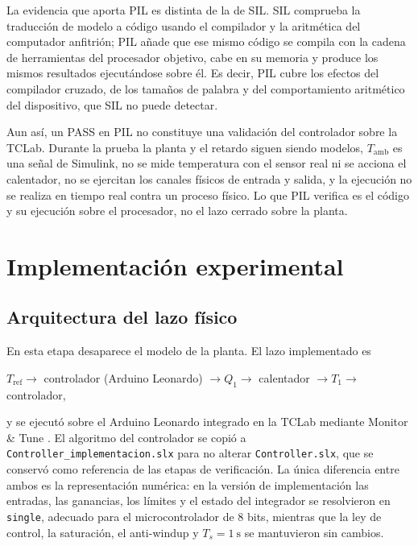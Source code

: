 \documentclass[conference,a4paper,10pt]{IEEEtran}
\newcommand{\Tref}{T_{\mathrm{ref}}}
\newcommand{\Tamb}{T_{\mathrm{amb}}}
\begin{document}
La evidencia que aporta PIL es distinta de la de SIL. SIL comprueba la traducción de modelo a código
usando el compilador y la aritmética del computador anfitrión; PIL añade que ese mismo código se
compila con la cadena de herramientas del procesador objetivo, cabe en su memoria y produce los
mismos resultados ejecutándose sobre él. Es decir, PIL cubre los efectos del compilador cruzado, de
los tamaños de palabra y del comportamiento aritmético del dispositivo, que SIL no puede detectar.

Aun así, un PASS en PIL no constituye una validación del controlador sobre la TCLab. Durante la
prueba la planta y el retardo siguen siendo modelos, $\Tamb$ es una señal de Simulink, no se mide
temperatura con el sensor real ni se acciona el calentador, no se ejercitan los canales físicos de
entrada y salida, y la ejecución no se realiza en tiempo real contra un proceso físico. Lo que PIL
verifica es el código y su ejecución sobre el procesador, no el lazo cerrado sobre la planta.

\section{Implementación experimental}

\subsection{Arquitectura del lazo físico}

En esta etapa desaparece el modelo de la planta. El lazo implementado es

\begin{center}
$\Tref \rightarrow$ controlador (Arduino Leonardo) $\rightarrow Q_1 \rightarrow$ calentador
$\rightarrow T_1 \rightarrow$ controlador,
\end{center}

y se ejecutó sobre el Arduino Leonardo integrado en la TCLab mediante Monitor \& Tune
\cite{mw_arduino}. El algoritmo del controlador se copió a
\texttt{Controller\_implementacion.slx} para no alterar \texttt{Controller.slx}, que se conservó
como referencia de las etapas de verificación. La única diferencia entre ambos es la representación
numérica: en la versión de implementación las entradas, las ganancias, los límites y el estado del
integrador se resolvieron en \texttt{single}, adecuado para el microcontrolador de 8 bits, mientras
que la ley de control, la saturación, el anti-windup y $T_s = \SI{1}{\second}$ se mantuvieron sin
cambios.
\end{document}
